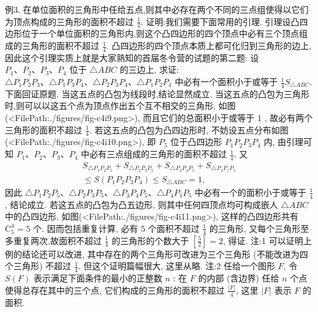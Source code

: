 例3. 在单位面积的三角形中任给五点,则其中必存在两个不同的三点组使得以它们为顶点构成的三角形的面积不超过 $\frac{1}{4}$.
证明:我们需要下面常用的引理.
引理设凸四边形位于一个单位面积的三角形内,则这个凸四边形的四个顶点中必有三个顶点组成的三角形的面积不超过 $\frac{1}{4}$.
凸四边形的四个顶点本质上都可化归到三角形的边上, 因此这个引理实质上就是大家熟知的首届冬令营的试题的第二题: 设 $P_1 、 P_2 、 P_3 、 P_4$ 位于 $\triangle A B C$ 的三边上, 求证: $\triangle P_1 P_2 P_3 、 \triangle P_1 P_3 P_4 、 \triangle P_2 P_3 P_4 、 \triangle P_1 P_2 P_4$ 中必有一个面积小于或等于 $\frac{1}{4} S_{\triangle A B C}$.
下面回证原题.
当这五点的凸包为线段时,结论显然成立.
当这五点的凸包为三角形时,则可以以这五个点为顶点作出五个互不相交的三角形, 如图(<FilePath:./figures/fig-c4i9.png>), 而且它们的总面积小于或等于 1 , 故必有两个三角形的面积不超过 $\frac{1}{4}$.
若这五点的凸包为凸四边形时, 不妨设五点分布如图(<FilePath:./figures/fig-c4i10.png>), 即 $P_5$ 位于凸四边形 $P_1 P_2 P_3 P_4$ 内, 由引理可知 $P_1 、 P_2 、 P_3 、 P_4$ 中必有三点组成的三角形的面积不超过 $\frac{1}{4}$, 又
$$
\begin{gathered}
S_{\triangle P_1 P_2 P_5}+S_{\triangle P_2 P_3 P_5}+S_{\triangle P_3 P_4 P_5}+S_{\triangle P_4 P_1 P_5} \\
\leqslant S\left(P_1 P_2 P_3 P_4\right) \leqslant S_{\triangle A B C}=1,
\end{gathered}
$$
因此 $\triangle P_1 P_2 P_5 、 \triangle P_2 P_3 P_5 、 \triangle P_3 P_4 P_5 、 \triangle P_4 P_1 P_5$ 中必有一个的面积小于或等于 $\frac{1}{4}$, 结论成立.
若这五点的凸包为凸五边形, 则其中任何四顶点均可构成嵌人 $\triangle A B C$ 中的凸四边形, 如图(<FilePath:./figures/fig-c4i11.png>), 这样的凸四边形共有 $\mathrm{C}_5^4=5$ 个.
因而包括重复计算, 必有 5 个面积不超过 $\frac{1}{4}$ 的三角形, 又每个三角形至多重复两次,故面积不超过 $\frac{1}{4}$ 的三角形的个数大于 $\left[\frac{5}{2}\right]=2$,
得证.
注:1 可以证明上例的结论还可以改进, 其中存在的两个三角形可改进为三个三角形 (不能改进为四个三角形) 不超过 $\frac{1}{4}$. 但这个证明篇幅很大, 这里从略.
注:2 任给一个图形 $F$, 令 $S(F)$ 表示满足下面条件的最小的正整数 $n$ : 在 $F$ 的内部 (含边界) 任给 $n$ 个点使得总存在其中的三个点, 它们构成的三角形的面积不超过 $\frac{|F|}{4}$, 这里 $|F|$ 表示 $F$ 的面积.



